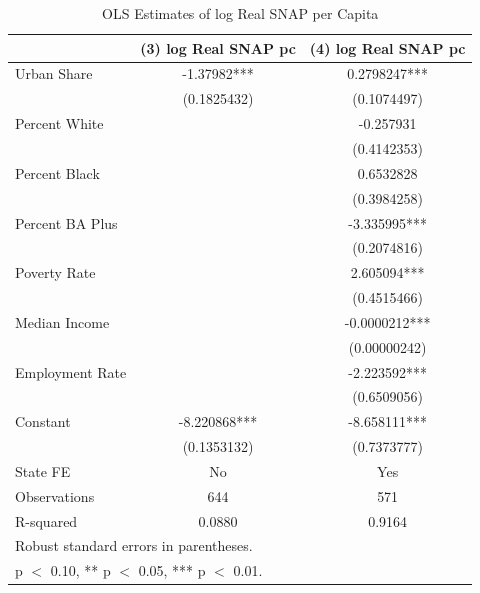 \documentclass{article}
\begin{document}
\begin{table}[H]
\centering
\caption{OLS Estimates of log Real SNAP per Capita}
\begin{tabular}{lcc}
\hline\hline
                    & (3) log Real SNAP pc & (4) log Real SNAP pc \\
\hline
Urban Share         & -1.37982***          & 0.2798247***         \\
                    & (0.1825432)          & (0.1074497)          \\[4pt]

Percent White       &                      & -0.257931            \\
                    &                      & (0.4142353)          \\[4pt]

Percent Black       &                      & 0.6532828            \\
                    &                      & (0.3984258)          \\[4pt]

Percent BA Plus     &                      & -3.335995***         \\
                    &                      & (0.2074816)          \\[4pt]

Poverty Rate        &                      & 2.605094***          \\
                    &                      & (0.4515466)          \\[4pt]

Median Income       &                      & -0.0000212***        \\
                    &                      & (0.00000242)         \\[4pt]

Employment Rate     &                      & -2.223592***         \\
                    &                      & (0.6509056)          \\[4pt]

Constant            & -8.220868***         & -8.658111***         \\
                    & (0.1353132)          & (0.7373777)          \\[6pt]
\hline
State FE            & No                   & Yes                  \\
Observations        & 644                  & 571                  \\
R-squared           & 0.0880               & 0.9164               \\
\hline\hline
\multicolumn{3}{l}{\footnotesize Robust standard errors in parentheses.} \\
\multicolumn{3}{l}{\footnotesize * p $<$ 0.10, ** p $<$ 0.05, *** p $<$ 0.01.} \\
\end{tabular}
\end{table}
\end{document}
